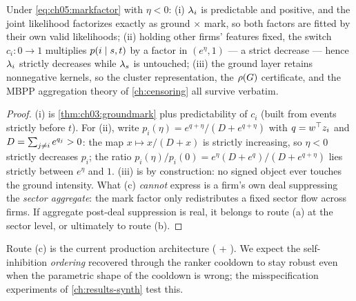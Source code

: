 \begin{proposition}\label{prop:ch05:cooldown}
Under \cref{eq:ch05:markfactor} with $\eta < 0$: (i) $\lambda_i$ is
predictable and positive, and the joint likelihood factorizes exactly as
ground $\times$ mark, so both factors are fitted by their own valid
likelihoods; (ii) holding other firms' features fixed, the switch $c_i: 0
\to 1$ multiplies $p(i \mid s,t)$ by a factor in $(e^{\eta}, 1)$ --- a
strict decrease --- hence $\lambda_i$ strictly decreases while $\lambda_s$ is
untouched; (iii) the ground layer retains nonnegative kernels, so the
cluster representation, the $\rho\!\left(G\right)$ certificate, and the MBPP
aggregation theory of \cref{ch:censoring} all survive verbatim.
\end{proposition}

\begin{proof}
(i) is \cref{thm:ch03:groundmark} plus predictability of $c_i$ (built
from events strictly before $t$). For (ii), write $p_i(\eta) =
e^{q+\eta}/(D + e^{q+\eta})$ with $q = w^\top z_i$ and $D =
\sum_{j\ne i} e^{q_j} > 0$: the map $x \mapsto x/(D+x)$ is strictly
increasing, so $\eta < 0$ strictly decreases $p_i$; the ratio
$p_i(\eta)/p_i(0) = e^{\eta}(D + e^{q})/(D + e^{q+\eta})$ lies strictly
between $e^{\eta}$ and $1$. (iii) is by construction: no signed object
ever touches the ground intensity. What (c) \emph{cannot} express is a
firm's own deal suppressing the \emph{sector aggregate}: the mark factor
only redistributes a fixed sector flow across firms. If aggregate
post-deal suppression is real, it belongs to route (a) at the sector
level, or ultimately to route (b).
\end{proof}

Route (c) is the current production architecture
( + ). We expect
the self-inhibition \emph{ordering} recovered through the ranker cooldown
to stay robust even when the parametric shape of the cooldown is wrong;
the misspecification experiments of \cref{ch:results-synth} test this.

